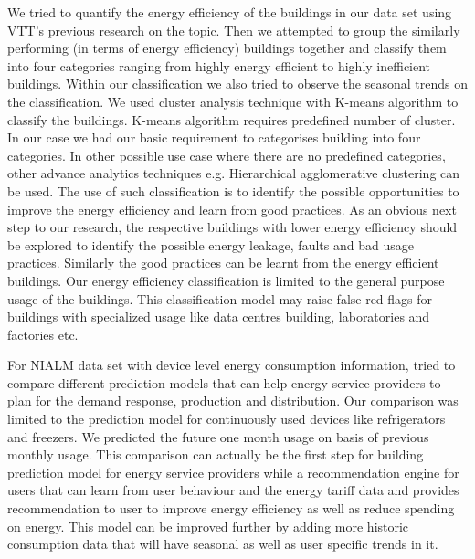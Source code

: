 We tried to quantify the energy efficiency of the buildings in our data set using VTT's previous research on the topic. Then we attempted to group the similarly performing (in terms of energy efficiency) buildings together and classify them into four categories ranging from highly energy efficient to highly inefficient buildings. Within our classification we also tried to observe the seasonal trends on the classification. We used cluster analysis technique with K-means algorithm to classify the buildings. K-means algorithm requires predefined number of cluster. In our case we had our basic requirement to categorises building into four categories. In other possible use case where there are no predefined categories, other advance analytics techniques e.g. Hierarchical agglomerative clustering can be used. The use of such classification is to identify the possible opportunities to improve the energy efficiency and learn from good practices. As an obvious next step to our research, the respective buildings with lower energy efficiency should be explored to identify the possible energy leakage, faults and bad usage practices. Similarly the good practices can be learnt from the energy efficient buildings. Our energy efficiency classification is limited to the general purpose usage of the buildings. This classification model may raise false red flags for buildings with specialized usage like data centres building, laboratories and factories etc. 

For NIALM data set with device level energy consumption information, tried to compare different prediction models that can help energy service providers to plan for the demand response, production and distribution. Our comparison was limited to the prediction model for continuously used devices like refrigerators and freezers. We predicted the future one month usage on basis of previous monthly usage. This comparison can actually be the first step for building prediction model for energy service providers while a recommendation engine for users that can learn from user behaviour and the energy tariff data and provides recommendation to user to improve energy efficiency as well as reduce spending on energy. This model can be improved further by adding more historic consumption data that will have seasonal as well as user specific trends in it.    